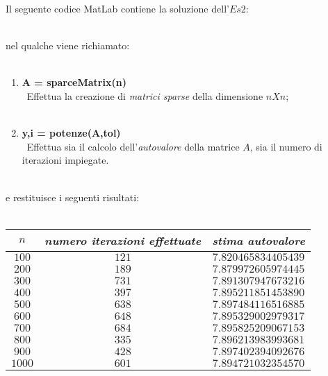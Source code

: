 Il seguente codice MatLab contiene la soluzione dell'$Es 2$:\\\
	
nel qualche viene richiamato:\\\
	\begin{enumerate}
		\item \textbf{A = sparceMatrix(n)}\\\
			Effettua la creazione di \textit{matrici sparse} della dimensione $nXn$;\\\
		\item \textbf{y,i = potenze(A,tol)}\\\
			Effettua sia il calcolo dell'\textit{autovalore} della matrice $A$, sia il numero di iterazioni impiegate.\\\
				
	\end{enumerate}
e restituisce i seguenti risultati:\\\
	\begin{center}
		\begin{tabular}{|c|c|c|}
			\hline
				$n$ & \textit{numero iterazioni effettuate} & \textit{stima autovalore} \\
			\hline
				$100$ & $121$ & $7.820465834405439$ \\
				$200$ & $189$ & $7.879972605974445$ \\
				$300$ & $731$ & $7.891307947673216$ \\
				$400$ & $397$ & $7.895211851453890$ \\
				$500$ & $638$ & $7.897484116516885$ \\
				$600$ & $648$ & $7.895329002979317$ \\
				$700$ & $684$ & $7.895825209067153$ \\
				$800$ & $335$ & $7.896213983993681$ \\
				$900$ & $428$ & $7.897402394092676$ \\
				$1000$ & $601$ & $7.894721032354570$ \\
			\hline 
		\end{tabular}
	\end{center}